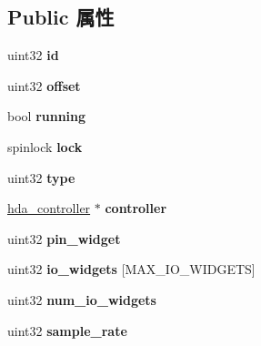 \subsection*{Public 属性}
\begin{DoxyCompactItemize}
\item 
\mbox{\label{structhda__stream_afa083a5ff3069b64cdd5bef45d4a413a}} 
uint32 {\bfseries id}
\item 
\mbox{\label{structhda__stream_aee6b3e8611cc99da9d3d6c0c432eba28}} 
uint32 {\bfseries offset}
\item 
\mbox{\label{structhda__stream_a63c56501dcdb15c379038df14ee8f7b1}} 
bool {\bfseries running}
\item 
\mbox{\label{structhda__stream_a872f2b8b1d8dcd69274f577db0bc352d}} 
spinlock {\bfseries lock}
\item 
\mbox{\label{structhda__stream_a0839932f5d533406319b7309165cad63}} 
uint32 {\bfseries type}
\item 
\mbox{\label{structhda__stream_acfd8a20a7106647362689250cff5a39f}} 
\hyperlink{structhda__controller}{hda\+\_\+controller} $\ast$ {\bfseries controller}
\item 
\mbox{\label{structhda__stream_aa86e9b6924d98377945cd68d2564ac76}} 
uint32 {\bfseries pin\+\_\+widget}
\item 
\mbox{\label{structhda__stream_a2af74684d0edc0027c445b783ffe884e}} 
uint32 {\bfseries io\+\_\+widgets} \mbox{[}M\+A\+X\+\_\+\+I\+O\+\_\+\+W\+I\+D\+G\+E\+TS\mbox{]}
\item 
\mbox{\label{structhda__stream_ad3e1028b70d4cd6dbc1556b1580e4fdb}} 
uint32 {\bfseries num\+\_\+io\+\_\+widgets}
\item 
\mbox{\label{structhda__stream_a4768167aee98a562747df8e1e83ef95c}} 
uint32 {\bfseries sample\+\_\+rate}
\item 
\mbox{\label{structhda__stream_a0b73154a122d647315ef4eec6a04ba94}} 

\end{DoxyCompactItemize}
